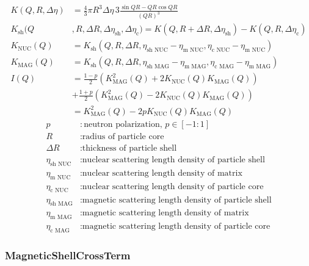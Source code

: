 \begin{align}
 K(Q,R,\Delta\eta) & = \frac{4}{3}\pi R^3 \Delta\eta \, 3 \frac{\sin QR - QR \cos
 QR}{(QR)^3} \\
   K_\text{sh}(Q&,R,\Delta R,\Delta\eta_\text{sh},\Delta\eta_\text{c}) = K(Q,R+\Delta R,\Delta\eta_\text{sh})-K(Q,R,\Delta\eta_\text{c})\\
   K_\text{NUC}(Q) &=
   K_\text{sh}(Q,R,\Delta R,\eta_{\text{sh NUC}}-\eta_{\text{m NUC}}, \eta_{\text{c NUC}}-\eta_{\text{m NUC}})\\
   K_\text{MAG}(Q) &=
   K_\text{sh}(Q,R,\Delta R,\eta_{\text{sh MAG}}-\eta_{\text{m MAG}}, \eta_{\text{c MAG}}-\eta_{\text{m MAG}})\\
   I(Q) &=
     \frac{1-p}{2}
     \left(K^2_\text{MAG}(Q)+2K_\text{NUC}(Q)K_\text{MAG}(Q)\right)
     \nonumber \\
   &+ \frac{1+p}{2} \left(K^2_\text{MAG}(Q)-2K_\text{NUC}(Q)K_\text{MAG}(Q)\right)\\
    &= K^2_\text{MAG}(Q) - 2p K_\text{NUC}(Q)K_\text{MAG}(Q)
\end{align}
\begin{align}
p            &: \text{neutron polarization, } p\in[-1:1] \nonumber \\
R            &: \text{radius of particle core} \nonumber \\
\Delta R     &: \text{thickness of particle shell} \nonumber \\
\eta_{\text{sh NUC}} &: \text{nuclear scattering length density of particle shell} \nonumber \\
\eta_{\text{m NUC}}  &: \text{nuclear scattering length density of matrix} \nonumber \\
\eta_{\text{c NUC}}  &: \text{nuclear scattering length density of particle core} \nonumber \\
\eta_{\text{sh MAG}} &: \text{magnetic scattering length density of particle shell} \nonumber \\
\eta_{\text{m MAG}}  &: \text{magnetic scattering length density of matrix} \nonumber \\
\eta_{\text{c MAG}}  &: \text{magnetic scattering length density
of particle core} \nonumber
\end{align}


\clearpage
\subsubsection{MagneticShellCrossTerm}
\label{sect:MagShellCrossTerm}
~\\

